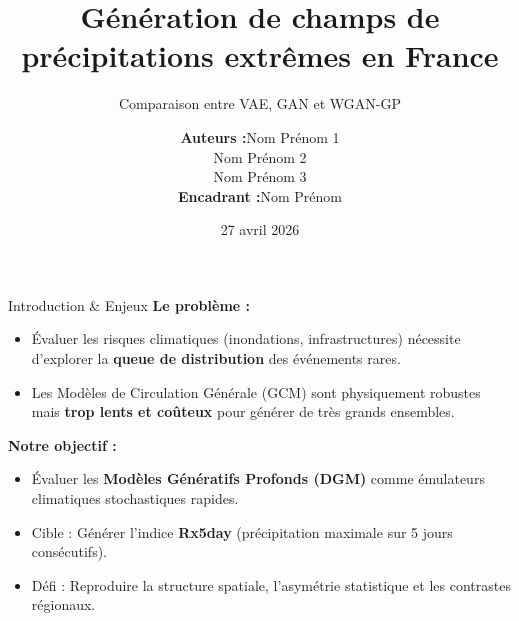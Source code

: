 \documentclass[10pt, aspectratio=169]{beamer}
\title[Génération d'extrêmes climatiques]{Génération de champs de précipitations extrêmes en France}
\subtitle{Comparaison entre VAE, GAN et WGAN-GP}
\author[Projet GenAI]{
    \begin{tabular}{rl}
        \textbf{Auteurs :} & Nom Prénom 1 \\
                           & Nom Prénom 2 \\
                           & Nom Prénom 3 \\[0.3em]
        \textbf{Encadrant :} & Nom Prénom
    \end{tabular}
}
\institute[ENSAE]{ENSAE Paris}
\date{27 avril 2026}
\begin{document}
\begin{frame}
    \titlepage
\end{frame}

\begin{frame}{Introduction \& Enjeux}
    \textbf{Le problème :}
    \begin{itemize}
        \item Évaluer les risques climatiques (inondations, infrastructures) nécessite d'explorer la \textbf{queue de distribution} des événements rares.
        \item Les Modèles de Circulation Générale (GCM) sont physiquement robustes mais \textbf{trop lents et coûteux} pour générer de très grands ensembles.
    \end{itemize}
    \vspace{0.5cm}
    \textbf{Notre objectif :}
    \begin{itemize}
        \item Évaluer les \textbf{Modèles Génératifs Profonds (DGM)} comme émulateurs climatiques stochastiques rapides.
        \item Cible : Générer l'indice \textbf{Rx5day} (précipitation maximale sur 5 jours consécutifs).
        \item Défi : Reproduire la structure spatiale, l'asymétrie statistique et les contrastes régionaux.
    \end{itemize}
\end{frame}
\end{document}
